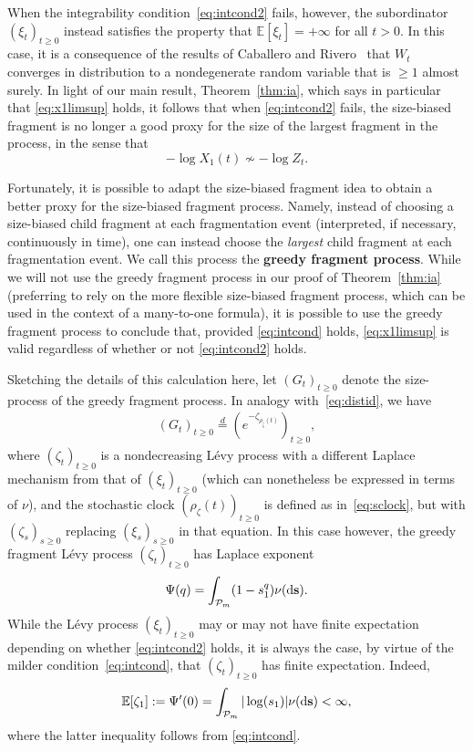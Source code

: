 \documentclass[a4,12pt]{amsart}
\numberwithin{equation}{section}
\newcommand{\MassP}{\mathcal{P}_{\rm m}}
\begin{document}
	When the integrability condition~\eqref{eq:intcond2} fails, however, 
	the subordinator $(\xi_t)_{t \geq 0}$ instead satisfies the property that 
	$\mathbb{E}[\xi_t] = +\infty$ for all $t > 0$.
	In this case, it is a consequence of the results of Caballero and Rivero~\cite{CR} 
	that $W_t$ converges in distribution to a nondegenerate random variable that is $\geq 1$ almost surely.
	In light of our main result, Theorem~\ref{thm:ia}, which says in particular that 
	\eqref{eq:x1limsup} holds, it follows that when \eqref{eq:intcond2} fails, 
	the size-biased fragment is no longer a good proxy for the size of the largest fragment in the process, in the sense that
	\[
		-\log X_1(t) \nsim -\log Z_t.
	\]

	Fortunately, it is possible to adapt the size-biased fragment idea to obtain a better proxy 
	for the size-biased fragment process. Namely, instead of choosing a size-biased child fragment 
	at each fragmentation event (interpreted, if necessary, continuously in time), 
	one can instead choose the \emph{largest} child fragment at each fragmentation event.
	We call this process the \textbf{greedy fragment process}.
	While we will not use the greedy fragment process in our proof of Theorem~\ref{thm:ia} 
	(preferring to rely on the more flexible size-biased fragment process, which can be used 
	in the context of a many-to-one formula), it is possible to use the greedy fragment process 
	to conclude that, provided \eqref{eq:intcond} holds, \eqref{eq:x1limsup} is valid
	regardless of whether or not \eqref{eq:intcond2} holds.

	Sketching the details of this calculation here, let $(G_t)_{t \geq 0}$ denote the size-process
	of the greedy fragment process. In analogy with~\eqref{eq:distid}, we have
	\begin{align*} 
    		(G_t)_{t \geq 0} \overset{d}{=} \left( e^{- \zeta_{\rho_\zeta(t)}} \right)_{t \geq 0},
	\end{align*}
	where $(\zeta_t)_{t \geq 0}$ is a nondecreasing L\'evy process with a different 
	Laplace mechanism from that of $(\xi_t)_{t \geq 0}$ (which can nonetheless be expressed in terms of $\nu$), 
	and the stochastic clock $(\rho_\zeta(t))_{t \geq 0}$ is defined as in~\eqref{eq:sclock}, 
	but with $(\zeta_s)_{s \geq 0}$ replacing $(\xi_s)_{s \geq 0}$ in that equation.
    In this case however, the greedy fragment L\'evy process $(\zeta_t)_{t \geq 0}$ has Laplace exponent
    \begin{align*}
        \Psi(q) = \int_{\MassP} (1 - s_1^q)\nu(\mathrm{d}\mathbf{s}). 
    \end{align*}
	While the L\'evy process $(\xi_t)_{t \geq 0}$ may or may not have finite expectation depending on 
	whether \eqref{eq:intcond2} holds, it is always the case, by virtue of the milder condition~\eqref{eq:intcond},
	that $(\zeta_t)_{t \geq 0}$ has finite expectation. Indeed,
    \begin{align*}
    \mathbb{E}[ \zeta_1 ] := \Psi'(0) = \int_{\MassP} |\log(s_1)|  \nu(\mathrm{d}\mathbf{s}) < \infty,
    \end{align*}
    where the latter inequality follows from \eqref{eq:intcond}. 
\end{document}
